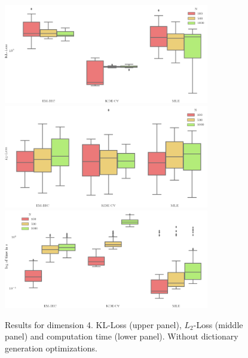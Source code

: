 \begin{figure}
\center
    \includegraphics[width=0.8\textwidth]{./TeX_files/dict_gen_loss_dim_4_KL.png}
    \includegraphics[width=0.8\textwidth]{./TeX_files/dict_gen_loss_dim_4_L2.png}
    \includegraphics[width=0.8\textwidth]{./TeX_files/dict_gen_time_dim_4.png}
    \caption{Results for dimension 4. KL-Loss (upper panel), $L_2$-Loss (middle panel) and computation time (lower panel). Without dictionary generation optimizations.}
    \label{fig:result_dict_gen_dim_4}
\end{figure}
